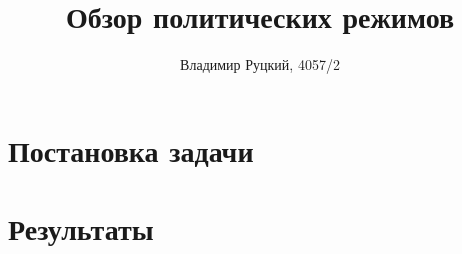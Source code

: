 \documentclass[a4paper,12pt,titlepage]{report}
\title{Обзор политических режимов}
\author{Владимир Руцкий, 4057/2}
\begin{document}
\maketitle

\section*{Постановка задачи}

\section*{Результаты}

\begin{thebibliography}{9}
\end{thebibliography}
\end{document}
